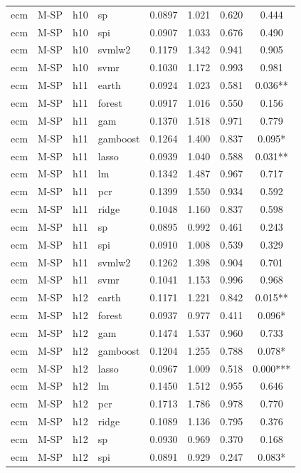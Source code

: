 \begin{ThreePartTable}
\begin{longtable}[t]{llclcccc}
ecm & M-SP & h10 & sp & 0.0897 & 1.021 & 0.620 & 0.444\\
ecm & M-SP & h10 & spi & 0.0907 & 1.033 & 0.676 & 0.490\\
ecm & M-SP & h10 & svmlw2 & 0.1179 & 1.342 & 0.941 & 0.905\\
ecm & M-SP & h10 & svmr & 0.1030 & 1.172 & 0.993 & 0.981\\
\addlinespace
ecm & M-SP & h11 & earth & 0.0924 & 1.023 & 0.581 & 0.036**\\
ecm & M-SP & h11 & forest & 0.0917 & 1.016 & 0.550 & 0.156\\
ecm & M-SP & h11 & gam & 0.1370 & 1.518 & 0.971 & 0.779\\
ecm & M-SP & h11 & gamboost & 0.1264 & 1.400 & 0.837 & 0.095*\\
ecm & M-SP & h11 & lasso & 0.0939 & 1.040 & 0.588 & 0.031**\\
ecm & M-SP & h11 & lm & 0.1342 & 1.487 & 0.967 & 0.717\\
ecm & M-SP & h11 & pcr & 0.1399 & 1.550 & 0.934 & 0.592\\
ecm & M-SP & h11 & ridge & 0.1048 & 1.160 & 0.837 & 0.598\\
ecm & M-SP & h11 & sp & 0.0895 & 0.992 & 0.461 & 0.243\\
ecm & M-SP & h11 & spi & 0.0910 & 1.008 & 0.539 & 0.329\\
ecm & M-SP & h11 & svmlw2 & 0.1262 & 1.398 & 0.904 & 0.701\\
ecm & M-SP & h11 & svmr & 0.1041 & 1.153 & 0.996 & 0.968\\
\addlinespace
ecm & M-SP & h12 & earth & 0.1171 & 1.221 & 0.842 & 0.015**\\
ecm & M-SP & h12 & forest & 0.0937 & 0.977 & 0.411 & 0.096*\\
ecm & M-SP & h12 & gam & 0.1474 & 1.537 & 0.960 & 0.733\\
ecm & M-SP & h12 & gamboost & 0.1204 & 1.255 & 0.788 & 0.078*\\
ecm & M-SP & h12 & lasso & 0.0967 & 1.009 & 0.518 & 0.000***\\
ecm & M-SP & h12 & lm & 0.1450 & 1.512 & 0.955 & 0.646\\
ecm & M-SP & h12 & pcr & 0.1713 & 1.786 & 0.978 & 0.770\\
ecm & M-SP & h12 & ridge & 0.1089 & 1.136 & 0.795 & 0.376\\
ecm & M-SP & h12 & sp & 0.0930 & 0.969 & 0.370 & 0.168\\
ecm & M-SP & h12 & spi & 0.0891 & 0.929 & 0.247 & 0.083*\\

\end{longtable}
\end{ThreePartTable}
